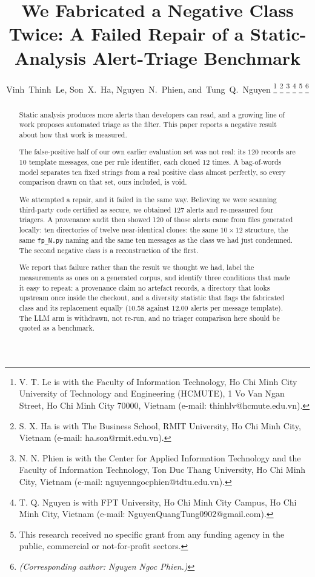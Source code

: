 \documentclass[journal]{IEEEtran}
\theoremstyle{definition}
\newcommand{\RNfp}{127}
\newcommand{\CMultFp}{10.58}
\newcommand{\CFpSecure}{120}
\begin{document}
\title{We Fabricated a Negative Class Twice: A Failed Repair of a Static-Analysis Alert-Triage Benchmark}

\author{%
  Vinh~Thinh~Le,
  Son~X.~Ha,
  Nguyen~N.~Phien,
  and~Tung~Q.~Nguyen%
  \thanks{V. T. Le is with the Faculty of Information Technology,
    Ho Chi Minh City University of Technology and Engineering (HCMUTE),
    1 Vo Van Ngan Street, Ho Chi Minh City 70000, Vietnam
    (e-mail: thinhlv@hcmute.edu.vn).}%
  \thanks{S. X. Ha is with The Business School, RMIT University,
    Ho Chi Minh City, Vietnam (e-mail: ha.son@rmit.edu.vn).}%
  \thanks{N. N. Phien is with the Center for Applied Information
    Technology and the Faculty of Information Technology, Ton Duc Thang
    University, Ho Chi Minh City, Vietnam
    (e-mail: nguyenngocphien@tdtu.edu.vn).}%
  \thanks{T. Q. Nguyen is with FPT University, Ho Chi Minh City Campus,
    Ho Chi Minh City, Vietnam (e-mail: NguyenQuangTung0902@gmail.com).}%
  \thanks{This research received no specific grant from any funding agency in the public, commercial or not-for-profit sectors.}%
  \thanks{\emph{(Corresponding author: Nguyen Ngoc Phien.)}}%
}

\maketitle

\begin{abstract}
Static analysis produces more alerts than developers can read, and a growing
line of work proposes automated triage as the filter. This paper reports a
negative result about how that work is measured.

The false-positive half of our own earlier evaluation set was not real: its
$120$ records are $10$ template messages, one per rule identifier, each cloned
$12$ times. A bag-of-words model separates ten fixed strings from a real
positive class almost perfectly, so every comparison drawn on that set, ours
included, is void.

We attempted a repair, and it failed in the same way. Believing we were
scanning third-party code certified as secure, we obtained \RNfp{} alerts and
re-measured four triagers. A provenance audit then showed
\CFpSecure{} of those alerts came from files generated locally: ten directories
of twelve near-identical clones: the same $10 \times 12$ structure, the same
\texttt{fp\_N.py} naming and the same ten messages as the class we had just
condemned. The second negative class
is a reconstruction of the first.

We report that failure rather than the result we thought we had, label the
measurements as ones on a generated corpus, and identify three conditions that
made it easy to repeat: a provenance claim no artefact records, a directory that
looks upstream once inside the checkout, and a diversity statistic that flags
the fabricated class and its replacement equally (\CMultFp{} against $12.00$
alerts per message template). The LLM arm is withdrawn, not re-run, and no
triager comparison here should be quoted as a benchmark.
\end{abstract}
\end{document}
